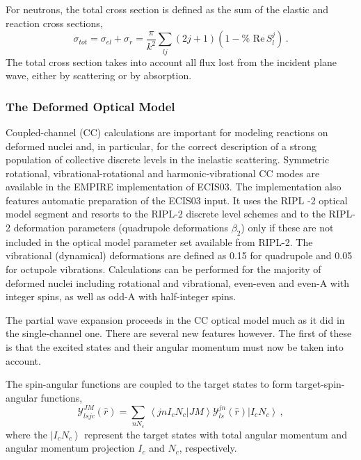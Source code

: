 For neutrons, the total cross section is defined as the sum of the elastic
and reaction cross sections, 
\begin{equation}
\sigma_{tot}=\sigma_{el}+\sigma_{r}=\frac{\pi}{k^{2}}\sum_{lj}(2j+1)(1-\text{%
Re}\, S_{l}^{j})\,.
\end{equation}
The total cross section takes into account all flux lost from the incident
plane wave, either by scattering or by absorption.

\subsubsection{The Deformed Optical Model\label{sec:DWBA-CC}}

Coupled-channel (CC) calculations are important for modeling reactions on
deformed nuclei and, in particular, for the correct description of a strong
population of collective discrete levels in the inelastic scattering.
Symmetric rotational, vibrational-rotational and harmonic-vibrational CC
modes are available in the EMPIRE implementation of ECIS03. The
implementation also features automatic preparation of the ECIS03 input. It
uses the RIPL%
-2 \cite{RIPL2} optical model segment and resorts to the RIPL-2
discrete level schemes and to the RIPL-2 deformation parameters (quadrupole
deformations $\beta _{2}$) only if these are not included in the optical
model parameter set available from RIPL-2. The vibrational (dynamical)
deformations are defined as 0.15 for quadrupole and 0.05 for octupole
vibrations. Calculations can be performed for the majority of deformed
nuclei including rotational and vibrational, even-even and even-A with
integer spins, as well as odd-A with half-integer spins.

The partial wave expansion proceeds in the CC optical model much as it did
in the single-channel one. There are several new features however. The first
of these is that the excited states and their angular momentum must now be
taken into account.

The spin-angular functions are coupled to the target states to form
target-spin-angular functions, 
\begin{equation}
{\mathcal{Y}}_{lsjc}^{JM}(%
\hat{r})=\sum_{nN_{c}}\,\left\langle jnI_{c}N_{c}|JM\right\rangle {\mathcal{Y%
}}_{ls}^{jn}(\hat{r})\left|I_{c}N_{c}\right\rangle \,,
\end{equation}
where the $\left|I_{c}N_{c}\right\rangle $ represent the target states with
total angular momentum and angular momentum projection $I_{c}$ and $N_{c}$,
respectively.

